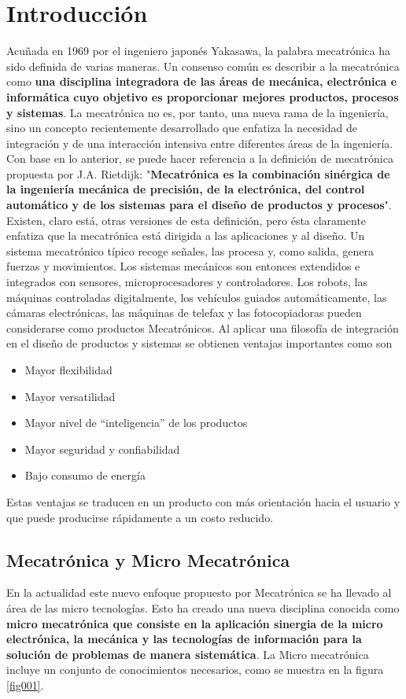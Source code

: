 \documentclass[12pt]{book}
\theoremstyle{definition}
\theoremstyle{remark}
\theoremstyle{plain}
\begin{document}
\chapter{Introducción}
Acuñada en 1969 por el ingeniero japonés Yakasawa, la palabra mecatrónica ha sido definida de varias maneras. Un consenso común es 
describir a la mecatrónica como \textbf{una disciplina integradora de las áreas de mecánica, electrónica e informática cuyo objetivo 
es proporcionar mejores productos, procesos y sistemas}. La mecatrónica no es, por tanto, una nueva rama de la ingeniería, sino un 
concepto recientemente desarrollado que enfatiza la necesidad de integración y de una interacción intensiva entre diferentes áreas 
de la ingeniería.
Con base en lo anterior, se puede hacer referencia a la definición de mecatrónica propuesta por J.A. Rietdijk: "\textbf{Mecatrónica 
es la combinación sinérgica de la ingeniería mecánica de precisión, de la electrónica, del control automático y de los sistemas para
 el diseño de productos y procesos}". Existen, claro está, otras versiones de esta definición, pero ésta claramente enfatiza que la 
mecatrónica está dirigida a las aplicaciones y al diseño.
Un sistema mecatrónico típico recoge señales, las procesa y, como salida, genera fuerzas y movimientos. Los sistemas mecánicos son
 entonces extendidos e integrados con sensores, microprocesadores y controladores. Los robots, las máquinas controladas digitalmente, 
los vehículos guiados automáticamente, las cámaras electrónicas, las máquinas de telefax y las fotocopiadoras pueden considerarse como 
productos Mecatrónicos. Al aplicar una filosofía de integración en el diseño de productos y sistemas se obtienen ventajas importantes 
como son

\begin{itemize}
\item  Mayor flexibilidad
\item  Mayor versatilidad
\item Mayor nivel de “inteligencia” de los productos
\item Mayor seguridad y confiabilidad
\item Bajo consumo de energía
\end{itemize}

Estas ventajas se traducen en un producto con más orientación hacia el usuario y que puede producirse rápidamente a un costo reducido.

\section{Mecatrónica y Micro Mecatrónica}
En la actualidad este nuevo enfoque propuesto por Mecatrónica se ha llevado al área de las micro tecnologías. Esto ha creado una nueva disciplina conocida como \textbf{micro mecatrónica que consiste en la aplicación sinergia de la micro electrónica, la mecánica y las tecnologías de información para la solución de problemas de manera sistemática}. La Micro mecatrónica incluye un conjunto de conocimientos necesarios, como se muestra en la figura \ref{fig001}.
\end{document}
